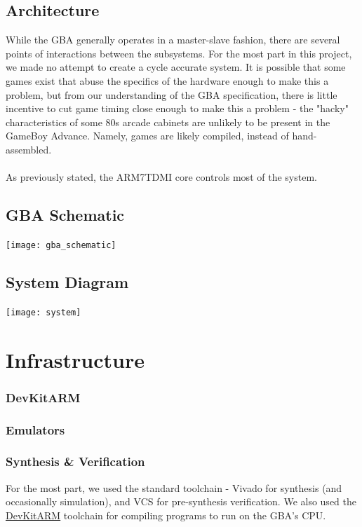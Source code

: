 \documentclass[11pt,a4paper,draft]{article}
\begin{document}
	
	\subsection{Architecture}
	While the GBA generally operates in a master-slave fashion, there are several points of interactions between the subsystems. For the most part in this project, we made no attempt to create a cycle accurate system. It is possible that some games exist that abuse the specifics of the hardware enough to make this a problem, but from our understanding of the GBA specification, there is little incentive to cut game timing close enough to make this a problem - the "hacky" characteristics of some 80s arcade cabinets are unlikely to be present in the GameBoy Advance. Namely, games are likely compiled, instead of hand-assembled.\\\\
	As previously stated, the ARM7TDMI core controls most of the system. 
	
	
	\subsection{GBA Schematic}
	\texttt{[image: gba\_schematic]}
	
	\subsection{System Diagram}
	\texttt{[image: system]}
	
	\section{Infrastructure}
	\subsubsection{DevKitARM}
	\subsubsection{Emulators}
	\subsubsection{Synthesis \& Verification}

	
	For the most part, we used the standard toolchain - Vivado for synthesis (and occasionally simulation), and VCS for pre-synthesis verification. We also used the \href{http://devkitpro.org/wiki/Getting_Started/devkitARM}{DevKitARM} toolchain for compiling programs to run on the GBA's CPU. 
	
\end{document}
